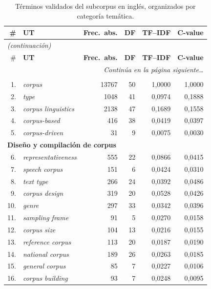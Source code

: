 \small
\begin{longtable}{@{} r p{5cm} r r r r @{}}
\toprule
\# & \textbf{UT} & \textbf{Frec.\ abs.} & \textbf{DF} & \textbf{TF--IDF} & \textbf{C-value} \\
\midrule
\endfirsthead
\multicolumn{6}{l}{\small\itshape (continuación)} \\
\toprule
\# & \textbf{UT} & \textbf{Frec.\ abs.} & \textbf{DF} & \textbf{TF--IDF} & \textbf{C-value} \\
\midrule
\endhead
\midrule
\multicolumn{6}{r}{\small\itshape Continúa en la página siguiente\ldots} \\
\endfoot
\bottomrule
\caption{Términos validados del subcorpus en inglés, organizados por
         categoría temática.}
\label{tab:terminos_en}
\endlastfoot
\multicolumn{6}{l}{\textbf{Conceptos fundacionales}} \\
\midrule
1. & \textit{corpus} & 13767 & 50 & 1{,}0000 & 1{,}0000 \\
2. & \textit{type} & 1048 & 41 & 0{,}0974 & 0{,}1888 \\
3. & \textit{corpus linguistics} & 2138 & 47 & 0{,}1689 & 0{,}1558 \\
4. & \textit{corpus-based} & 416 & 38 & 0{,}0419 & 0{,}0397 \\
5. & \textit{corpus-driven} & 31 & 9 & 0{,}0075 & 0{,}0030 \\
\midrule
\multicolumn{6}{l}{\textbf{Diseño y compilación de corpus}} \\
\midrule
6. & \textit{representativeness} & 555 & 22 & 0{,}0866 & 0{,}0415 \\
7. & \textit{speech corpus} & 151 & 6 & 0{,}0424 & 0{,}0310 \\
8. & \textit{text type} & 266 & 24 & 0{,}0392 & 0{,}0486 \\
9. & \textit{corpus design} & 319 & 20 & 0{,}0528 & 0{,}0426 \\
10. & \textit{genre} & 297 & 33 & 0{,}0342 & 0{,}0396 \\
11. & \textit{sampling frame} & 91 & 5 & 0{,}0270 & 0{,}0158 \\
12. & \textit{corpus size} & 104 & 13 & 0{,}0216 & 0{,}0155 \\
13. & \textit{reference corpus} & 113 & 20 & 0{,}0187 & 0{,}0190 \\
14. & \textit{national corpus} & 189 & 26 & 0{,}0263 & 0{,}0185 \\
15. & \textit{general corpus} & 85 & 7 & 0{,}0227 & 0{,}0106 \\
16. & \textit{corpus building} & 93 & 7 & 0{,}0248 & 0{,}0095 \\

\end{longtable}
